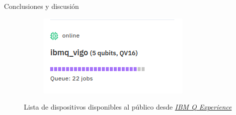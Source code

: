 \begin{frame}{Conclusiones y discusión}
\begin{figure}[H]
\begin{subfigure}{0.19\linewidth}
    \end{subfigure}
    \begin{subfigure}{0.19\linewidth}
        \centering
        \includegraphics[scale=0.35]{images/vigo.png}
    \end{subfigure}
    \caption{Lista de dispositivos disponibles al público desde \href{https://quantum-computing.ibm.com/}{\textit{IBM Q Experience}}}
\end{figure}
\end{frame}